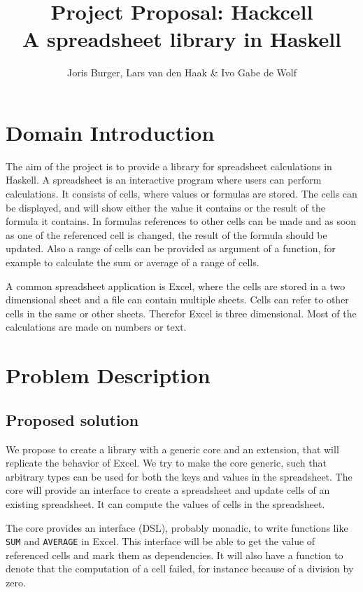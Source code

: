 \documentclass{article}
\title{
	\vskip -3cm
	Project Proposal: Hackcell \\
	\vskip 0.5cm
	\large{A spreadsheet library in Haskell}
}
\author{Joris Burger, Lars van den Haak \& Ivo Gabe de Wolf}
\begin{document}
	\maketitle
	\section{Domain Introduction}
	The aim of the project is to provide a library for spreadsheet calculations in Haskell. A spreadsheet is an interactive program where users can perform calculations. It consists of cells, where values or formulas are stored. The cells can be displayed, and will show either the value it contains or the result of the formula it contains. In formulas references to other cells can be made and as soon as one of the referenced cell is changed, the result of the formula should be updated. Also a range of cells can be provided as argument of a function, for example to calculate the sum or average of a range of cells. 
	
	A common spreadsheet application is Excel, where the cells are stored in a two dimensional sheet and a file can contain multiple sheets. Cells can refer to other cells in the same or other sheets. Therefor Excel is three dimensional. Most of the calculations are made on numbers or text. 
	
	\section{Problem Description}
	
	\subsection{Proposed solution}
	We propose to create a library with a generic core and an extension, that will replicate the behavior of Excel. We try to make the core generic, such that arbitrary types can be used for both the keys and values in the spreadsheet. The core will provide an interface to create a spreadsheet and update cells of an existing spreadsheet. It can compute the values of cells in the spreadsheet.
	
	The core provides an interface (DSL), probably monadic, to write functions like \texttt{SUM} and \texttt{AVERAGE} in Excel. This interface will be able to get the value of referenced cells and mark them as dependencies. It will also have a function to denote that the computation of a cell failed, for instance because of a division by zero.
	
\end{document}
